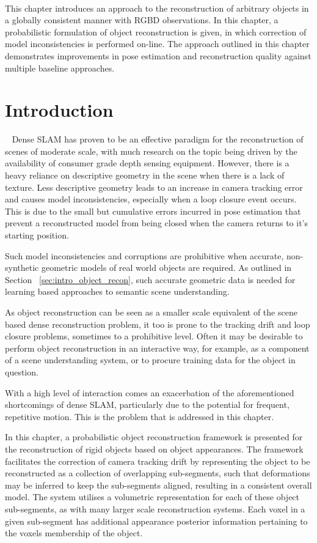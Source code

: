 ~\label{chap:probobj}
\begin{chapterabstract}
This chapter introduces an approach to the reconstruction of arbitrary objects 
in a globally consistent manner with RGBD observations. In this chapter, a 
probabilistic formulation of object reconstruction is given, in which correction 
of model inconsistencies is performed on-line. The approach outlined in this 
chapter demonstrates improvements in pose estimation and reconstruction quality 
against multiple baseline approaches.
\end{chapterabstract}

\section{Introduction}
~\label{sec:probobj_introduction}
Dense SLAM has proven to be an effective paradigm for the reconstruction of 
scenes of moderate scale, with much research on the topic being driven by the 
availability of consumer grade depth sensing equipment. However, there is a 
heavy reliance on descriptive geometry in the scene when there is a lack of 
texture. Less descriptive geometry leads to an increase in camera tracking 
error and causes model inconsistencies, especially when a loop closure event 
occurs. This is due to the small but cumulative errors incurred in pose 
estimation that prevent a reconstructed model from being closed when the 
camera returns to it's starting position.

Such model inconsistencies and corruptions are prohibitive when accurate, non-synthetic 
geometric models of real world objects are required. As outlined in Section
~\ref{sec:intro_object_recon}, such accurate geometric data is needed for learning 
based approaches to semantic scene understanding.

As object reconstruction can be seen as a smaller scale equivalent of the scene
based dense reconstruction problem, it too is prone to the tracking drift and
loop closure problems, sometimes to a prohibitive level. Often it may be
desirable to perform object reconstruction in an interactive way, for example,
as a component of a scene understanding system, or to procure training data for
the object in question.

With a high level of interaction comes an exacerbation of the aforementioned
shortcomings of dense SLAM, particularly due to the potential for frequent,
repetitive motion. This is the problem that is addressed in this chapter.

In this chapter, a probabilistic object reconstruction framework is presented
for the reconstruction of rigid objects based on object appearances.
The framework facilitates the correction of camera tracking drift by
representing the object to be reconstructed as a collection of overlapping
sub-segments, such that deformations may be inferred to keep the sub-segments
aligned, resulting in a consistent overall model. The system utilises a
volumetric representation for each of these object sub-segments, as with many
larger scale reconstruction systems. Each voxel in a given sub-segment has
additional appearance posterior information pertaining to the voxels membership
of the object.

